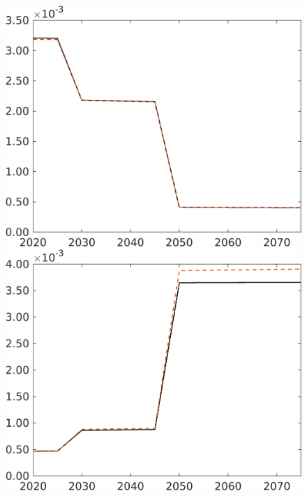 \begin{figure}[h!!]
\begin{minipage}[]{0.32\textwidth}
	\end{minipage}
	\begin{minipage}[]{0.32\textwidth}
		\includegraphics[width=1\textwidth]{../../codding_model/own_basedOnFried/optimalPol_elastS_DisuSci/figures/all_1705/comp_notaul_OPT_T_NoTaus_Lf_spillover0_sep1_BN0_ineq0_etaa0.79.png}
	\end{minipage}
	\begin{minipage}[]{0.32\textwidth}
		\includegraphics[width=1\textwidth]{../../codding_model/own_basedOnFried/optimalPol_elastS_DisuSci/figures/all_1705/comp_notaul_OPT_T_NoTaus_Lg_spillover0_sep1_BN0_ineq0_etaa0.79.png}

\end{minipage}
\end{figure}
